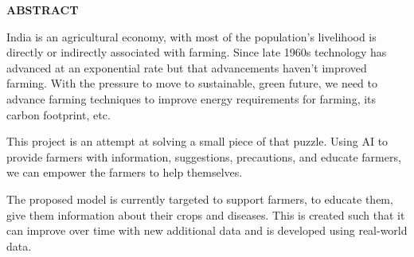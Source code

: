 \documentclass[../Report.tex]{subfiles}
\begin{document}
\begin{center}
    \textbf{ABSTRACT}
\end{center}

India is an agricultural economy, with most of the population's livelihood is directly or indirectly associated with farming. Since late 
1960s technology has advanced at an exponential rate but that advancements haven't improved farming. With the pressure to move to
sustainable, green future, we need to advance farming techniques to improve energy requirements for farming, its carbon footprint, etc. \par

This project is an attempt at solving a small piece of that puzzle. Using AI to provide farmers with information, suggestions, precautions,
and educate farmers, we can empower the farmers to help themselves.\par

The proposed model is currently targeted to support farmers, to educate them, give them information about their crops and diseases. This 
is created such that it can improve over time with new additional data and is developed using real-world data.

\pagebreak
\end{document}
